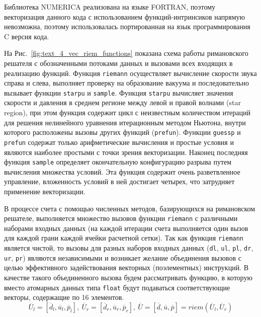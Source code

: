 Библиотека NUMERICA реализована на языке FORTRAN, поэтому векторизация данного кода с использованием функций-интринсиков\label{term:intrinsic5} напрямую невозможна, поэтому использовалась портированная на язык программирования C версия кода.

На Рис.~\ref{fig:text_4_vec_riem_functions} показана схема работы римановского решателя с обозначенными потоками данных и вызовами всех входящих в реализацию функций.
Функция \texttt{riemann} осуществляет вычисление скорости звука справа и слева, выполняет проверку на образование вакуума и последовательно вызывает функции \texttt{starpu} и \texttt{sample}.
Функция \texttt{starpu} вычисляет значения скорости и давления в среднем регионе между левой и правой волнами (star region), при этом функция содержит цикл с неизвестным количеством итераций для решения нелинейного уравнения итерационным методом Ньютона, внутри которого расположены вызовы других функций (\texttt{prefun}).
Функции \texttt{guessp} и \texttt{prefun} содержат только арифметические вычисления и простые условия и являются наиболее простыми с точки зрения векторизации.
Наконец последняя функция \texttt{sample} определяет окончательную конфигурацию разрыва путем вычисления множества условий.
Эта функция содержит очень разветвленное управление, вложенность условий в ней достигает четырех, что затрудняет применение векторизации.

В процессе счета с помощью численных методов, базирующихся на римановском решателе, выполняется множество вызовов функции \texttt{riemann} с различными наборами входных данных (на каждой итерации счета выполняется один вызов для каждой грани каждой ячейки расчетной сетки).
Так как функция \texttt{riemann} является чистой, то вызовы для разных наборов входных данных (\texttt{dl}, \texttt{ul}, \texttt{pl}, \texttt{dr}, \texttt{ur}, \texttt{pr}) являются независимыми и возникает желание объединения вызовов с целью эффективного задействования векторных (поэлементных) инструкций.
В качестве такого объединенного вызова будем рассматривать функцию, в которую вместо атомарных данных типа \texttt{float} будут подаваться соответствующие векторы, содержащие по 16 элементов.
\begin{equation}\label{eqn:text_4_vec_riem_riemann_16}
\overline{U}_l = [\overline{d}_l, \overline{u}_l, \overline{p}_l], \ 
\overline{U}_r = [\overline{d}_r, \overline{u}_r, \overline{p}_r], \ 
\overline{U} = [\overline{d}, \overline{u}, \overline{p}] = riem(\overline{U}_l, \overline{U}_r)
\end{equation}

